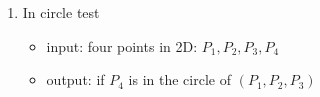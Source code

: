 \documentclass[12pt]{article}
\begin{document}
\begin{enumerate}[1)]
\item In circle test
  \begin{itemize}
  \item input: four points in 2D: $P_1, P_2, P_3, P_4$
  \item output: if $P_4$ is in the circle of $(P_1, P_2, P_3)$
  \end{itemize}
\end{enumerate}

\pagebreak

\end{document}
